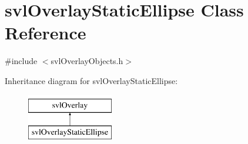 \hypertarget{classsvl_overlay_static_ellipse}{\section{svl\-Overlay\-Static\-Ellipse Class Reference}
\label{classsvl_overlay_static_ellipse}
}


{\ttfamily \#include $<$svl\-Overlay\-Objects.\-h$>$}

Inheritance diagram for svl\-Overlay\-Static\-Ellipse\-:\begin{figure}[H]
\begin{center}
\leavevmode
\includegraphics[height=2.000000cm]{d6/db0/classsvl_overlay_static_ellipse}
\end{center}
\end{figure}
